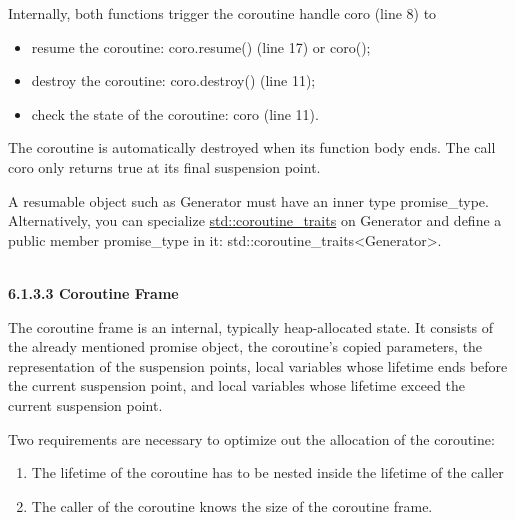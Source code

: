 Internally, both functions trigger the coroutine handle coro (line 8) to

\begin{itemize}
\item 
resume the coroutine: coro.resume() (line 17) or coro();

\item 
destroy the coroutine: coro.destroy() (line 11);

\item 
check the state of the coroutine: coro (line 11).
\end{itemize}

The coroutine is automatically destroyed when its function body ends. The call coro only returns true at its final suspension point.

\begin{tcolorbox}[breakable,enhanced jigsaw,colback=red!5!white,colframe=red!75!black,title={The resumable object requires an inner type promise\_type}]
A resumable object such as Generator must have an inner type promise\_type. Alternatively, you can specialize \href{https://en.cppreference.com/w/cpp/coroutine/coroutine_traits}{std::coroutine\_traits} on Generator and define a public member promise\_type in it: std::coroutine\_traits<Generator>.
\end{tcolorbox}

\hspace*{\fill} \\ %
\noindent
\textbf{6.1.3.3\hspace{0.2cm} Coroutine Frame}

The coroutine frame is an internal, typically heap-allocated state. It consists of the already mentioned promise object, the coroutine’s copied parameters, the representation of the suspension points, local variables whose lifetime ends before the current suspension point, and local variables whose lifetime exceed the current suspension point.

Two requirements are necessary to optimize out the allocation of the coroutine:

\begin{enumerate}
\item 
The lifetime of the coroutine has to be nested inside the lifetime of the caller

\item 
The caller of the coroutine knows the size of the coroutine frame.

\end{enumerate}

